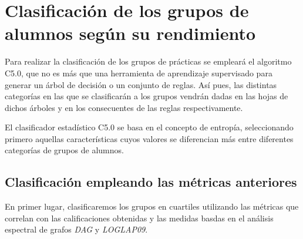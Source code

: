 \chapter{Clasificación de los grupos de alumnos según su rendimiento}\label{sec:chapterXIII}

Para realizar la clasificación de los grupos de prácticas se empleará el algoritmo C5.0, que no es más que una herramienta de aprendizaje supervisado para generar un árbol de decisión o un conjunto de reglas. Así pues, las distintas categorías en las que se clasificarán a los grupos vendrán dadas en las hojas de dichos árboles y en los consecuentes de las reglas respectivamente.

El clasificador estadístico C5.0 se basa en el concepto de entropía, seleccionando primero aquellas características cuyos valores se diferencian más entre diferentes categorías de grupos de alumnos.

\section{Clasificación empleando las métricas anteriores}

En primer lugar, clasificaremos los grupos en cuartiles utilizando las métricas que correlan con las calificaciones obtenidas y las medidas basdas en el análisis espectral de grafos \emph{DAG} y \emph{LOGLAP09}.